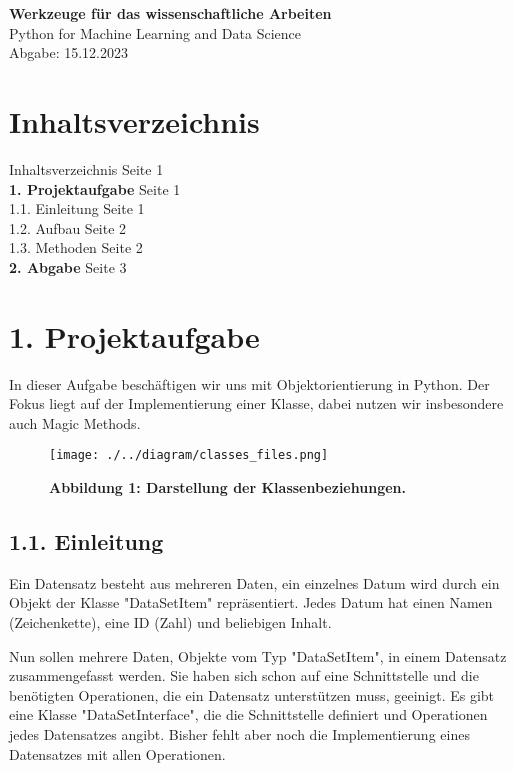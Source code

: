 \documentclass[a4paper,12pt]{article}
\begin{document}
\begin{flushleft}
{\bfseries\Large Werkzeuge f\"ur das wissenschaftliche Arbeiten}\\
\normalsize Python for Machine Learning and Data Science\\
\normalfont\hspace*{4.5cm}Abgabe: 15.12.2023\\
\hrulefill
\end{flushleft}

\section*{Inhaltsverzeichnis}
Inhaltsverzeichnis \dotfill Seite 1\\
\textbf{1. Projektaufgabe} \dotfill Seite 1\\
1.1. Einleitung \dotfill Seite 1\\
1.2. Aufbau \dotfill Seite 2\\
1.3. Methoden \dotfill Seite 2\\
\textbf{2. Abgabe} \dotfill Seite 3\\
\hrulefill

\section{1. Projektaufgabe}
\justify
In dieser Aufgabe besch\"aftigen wir uns mit Objektorientierung in Python. Der Fokus liegt auf der Implementierung einer Klasse, dabei nutzen wir insbesondere auch Magic Methods.

\begin{figure}[h!]
    \centering
    \texttt{[image: ./../diagram/classes\_files.png]}
    \caption*{\scriptsize\bfseries Abbildung 1: \normalfont Darstellung der Klassenbeziehungen.}
\end{figure}

\subsection{1.1. Einleitung}
\justify
Ein Datensatz besteht aus mehreren Daten, ein einzelnes Datum wird durch ein Objekt der Klasse "DataSetItem" repr\"asentiert. Jedes Datum hat einen Namen (Zeichenkette), eine ID (Zahl) und beliebigen Inhalt.

Nun sollen mehrere Daten, Objekte vom Typ "DataSetItem", in einem Datensatz zusammengefasst werden. Sie haben sich schon auf eine Schnittstelle und die ben\"otigten Operationen, die ein Datensatz unterst\"utzen muss, geeinigt. Es gibt eine Klasse "DataSetInterface", die die Schnittstelle definiert und Operationen jedes Datensatzes angibt. Bisher fehlt aber noch die Implementierung eines Datensatzes mit allen Operationen.
\end{document}
